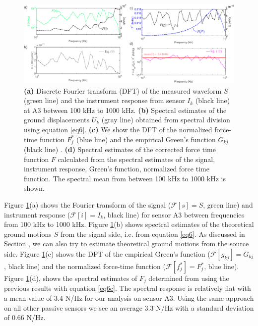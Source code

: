 \documentclass[preprint,3p, 11pt,authoryear]{elsarticle}
\begin{document}
\begin{figure}[ht]
     	\centering
\includegraphics[scale= 0.9]{FIG7.pdf} 
\caption{\textbf{(a)} Discrete Fourier transform (DFT) of the measured waveform $S$ (green line) and the instrument response from sensor $I_{k}$ (black line) at A3 between 100 kHz to 1000 kHz. \textbf{(b)} Spectral estimates of the ground displacements $U_{k}$ (gray line) obtained from spectral division using equation \eqref{eq6}. \textbf{(c)} We show the DFT of the normalized force-time function $F_{j}^{*}$ (blue line) and the empirical Green's function $G_{kj}$ (black line) . \textbf{(d)} Spectral estimates of the corrected force time function $F$ calculated from the spectral estimates of the signal, instrument response, Green's function, normalized force time function. The spectral mean from between 100 kHz to 1000 kHz is shown.}
	\label{fig7} 
\end{figure}

Figure \ref{fig7}(a) shows the Fourier transform of the signal ($\mathcal{F}[s] = S$, green line) and instrument response ($\mathcal{F}[i] = I_{k}$, black line) for sensor A3 between frequencies from 100 kHz to 1000 kHz. Figure \ref{fig7}(b) shows spectral estimates of the theoretical ground motions $S$ from the signal side, i.e. from equation \eqref{eq6}.  As discussed in Section \label{Spec_deconv}, we can also try to estimate  theoretical ground motions from the source side.  Figure \ref{fig7}(c) shows the DFT of the empirical Green's function ($\mathcal{F}[g_{kj}] = G_{kj}$, black line) and the normalized force-time function ($\mathcal{F}[f^{*}_{j}] = F^{*}_{j}$, blue line). Figure \ref{fig7}(d), shows the spectral estimates of $F_{j}$ determined from using the previous results with equation \eqref{eq6c}.  The spectral response is relatively flat with a mean value of 3.4 N/Hz for our analysis on sensor A3.  Using the same approach on all other passive sensors we see an average 3.3 N/Hz with a standard deviation of 0.66 N/Hz. 
\end{document}
